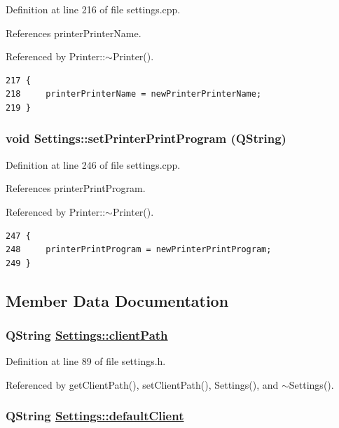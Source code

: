 Definition at line 216 of file settings.cpp.

References printer\-Printer\-Name.

Referenced by Printer::$\sim$Printer().

\footnotesize\begin{verbatim}217 {
218     printerPrinterName = newPrinterPrinterName;
219 }
\end{verbatim}\normalsize 


\hypertarget{classSettings_a26}{
\subsubsection[setPrinterPrintProgram]{\setlength{\rightskip}{0pt plus 5cm}void Settings::set\-Printer\-Print\-Program (QString)}}
\label{classSettings_a26}


Definition at line 246 of file settings.cpp.

References printer\-Print\-Program.

Referenced by Printer::$\sim$Printer().

\footnotesize\begin{verbatim}247 {
248     printerPrintProgram = newPrinterPrintProgram;
249 }
\end{verbatim}\normalsize 




\subsection{Member Data Documentation}
\hypertarget{classSettings_r0}{
\subsubsection[clientPath]{\setlength{\rightskip}{0pt plus 5cm}QString \hyperlink{classSettings_r0}{Settings::client\-Path}}}
\label{classSettings_r0}


Definition at line 89 of file settings.h.

Referenced by get\-Client\-Path(), set\-Client\-Path(), Settings(), and $\sim$Settings().\hypertarget{classSettings_r4}{
\subsubsection[defaultClient]{\setlength{\rightskip}{0pt plus 5cm}QString \hyperlink{classSettings_r4}{Settings::default\-Client}}}
\label{classSettings_r4}


